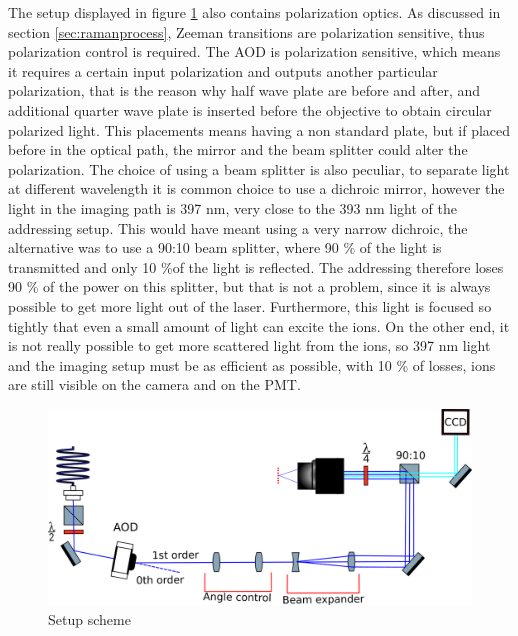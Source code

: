 The setup displayed in figure \ref{addressingsetup} also contains polarization optics. As discussed in section \ref{sec:ramanprocess}, Zeeman transitions are polarization sensitive, thus polarization control is required. The AOD is polarization sensitive, which means it requires a certain input polarization and outputs another particular polarization, that is the reason why half wave plate are before and after, and additional quarter wave plate is inserted before the objective to obtain circular polarized light. This placements means having a non standard plate, but if placed before in the optical path, the mirror and the beam splitter could alter the polarization. The choice of using a beam splitter is also peculiar, to separate light at different wavelength it is common choice to use a dichroic mirror, however the light in the imaging path is 397 nm, very close to the 393 nm light of the addressing setup. This would have meant using a very narrow dichroic, the alternative was to use a 90:10 beam splitter, where 90 \% of the light is transmitted and only 10 \%of the light is reflected. The addressing therefore loses 90 \% of the power on this splitter, but that is not a problem, since it is always possible to get more light out of the laser. Furthermore, this light is focused so tightly that even a small amount of light can excite the ions. On the other end, it is not really possible to get more scattered light from the ions, so 397 nm light and the imaging setup must be as efficient as possible, with 10 \% of losses, ions are still visible on the camera and on the PMT.

\begin{figure}
\centering
\includegraphics[width=\textwidth]{img/setup}
\caption{Setup scheme}
\label{addressingsetup}
\end{figure}

